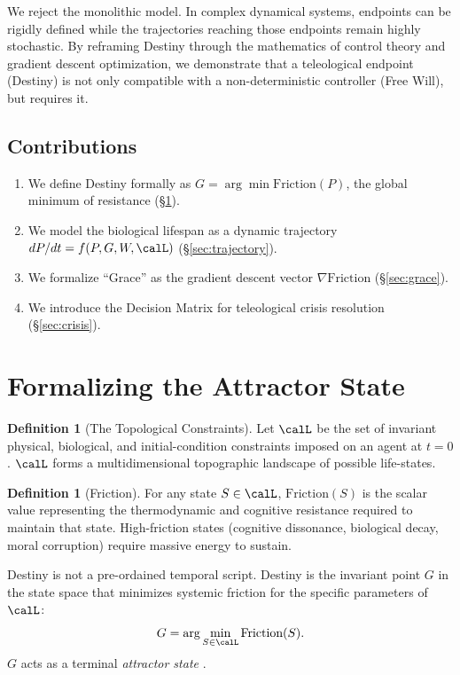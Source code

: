 \documentclass[12pt, a4paper]{article}
\theoremstyle{plain}
\theoremstyle{definition}
\newtheorem{definition}[theorem]{Definition}
\begin{document}
We reject the monolithic model. In complex dynamical systems, endpoints can be rigidly defined while the trajectories reaching those endpoints remain highly stochastic. By reframing Destiny through the mathematics of control theory and gradient descent optimization, we demonstrate that a teleological endpoint (Destiny) is not only compatible with a non-deterministic controller (Free Will), but requires it.

\subsection{Contributions}
\begin{enumerate}
    \item We define Destiny formally as $G = \arg\min \text{Friction}(P)$, the global minimum of resistance (\S\ref{sec:def}).
    \item We model the biological lifespan as a dynamic trajectory $dP/dt = f(P, G, W, \calL)$ (\S\ref{sec:trajectory}).
    \item We formalize ``Grace'' as the gradient descent vector $\nabla \text{Friction}$ (\S\ref{sec:grace}).
    \item We introduce the Decision Matrix for teleological crisis resolution (\S\ref{sec:crisis}).
\end{enumerate}

\section{Formalizing the Attractor State}\label{sec:def}

\begin{definition}[The Topological Constraints]
Let $\calL$ be the set of invariant physical, biological, and initial-condition constraints imposed on an agent at $t=0$. $\calL$ forms a multidimensional topographic landscape of possible life-states.
\end{definition}

\begin{definition}[Friction]
For any state $S \in \calL$, $\text{Friction}(S)$ is the scalar value representing the thermodynamic and cognitive resistance required to maintain that state. High-friction states (cognitive dissonance, biological decay, moral corruption) require massive energy to sustain.
\end{definition}

\begin{axiom}
Destiny is not a pre-ordained temporal script. Destiny is the invariant point $G$ in the state space that minimizes systemic friction for the specific parameters of $\calL$:
\begin{equation}
    G = \arg\min_{S \in \calL} \text{Friction}(S).
\end{equation}
$G$ acts as a terminal \emph{attractor state} \citep{Lorenz1963}.
\end{axiom}
\end{document}
